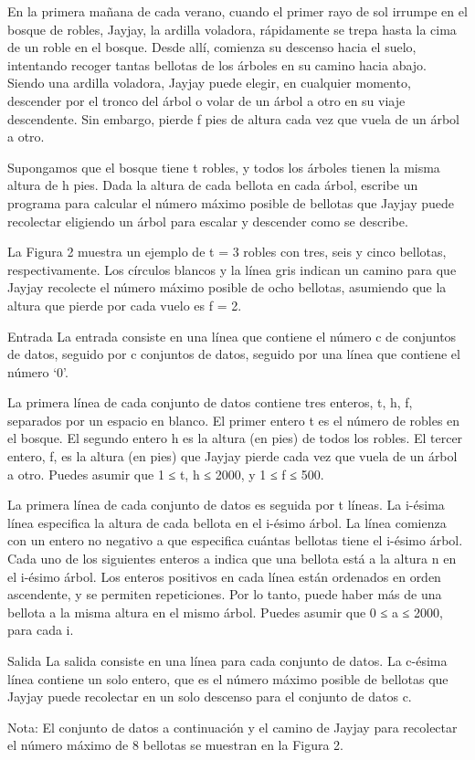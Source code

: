 En la primera mañana de cada verano, cuando el primer rayo de sol irrumpe en el bosque de robles, Jayjay, la ardilla voladora, rápidamente se trepa hasta la cima de un roble en el bosque. Desde allí, comienza su descenso hacia el suelo, intentando recoger tantas bellotas de los árboles en su camino hacia abajo. Siendo una ardilla voladora, Jayjay puede elegir, en cualquier momento, descender por el tronco del árbol o volar de un árbol a otro en su viaje descendente. Sin embargo, pierde f pies de altura cada vez que vuela de un árbol a otro. 

Supongamos que el bosque tiene t robles, y todos los árboles tienen la misma altura de h pies. Dada la altura de cada bellota en cada árbol, escribe un programa para calcular el número máximo posible de bellotas que Jayjay puede recolectar eligiendo un árbol para escalar y descender como se describe. 

La Figura 2 muestra un ejemplo de t = 3 robles con tres, seis y cinco bellotas, respectivamente. Los círculos blancos y la línea gris indican un camino para que Jayjay recolecte el número máximo posible de ocho bellotas, asumiendo que la altura que pierde por cada vuelo es f = 2. 

Entrada 
La entrada consiste en una línea que contiene el número c de conjuntos de datos, seguido por c conjuntos de datos, seguido por una línea que contiene el número ‘0’. 

La primera línea de cada conjunto de datos contiene tres enteros, t, h, f, separados por un espacio en blanco. El primer entero t es el número de robles en el bosque. El segundo entero h es la altura (en pies) de todos los robles. El tercer entero, f, es la altura (en pies) que Jayjay pierde cada vez que vuela de un árbol a otro. Puedes asumir que 1 ≤ t, h ≤ 2000, y 1 ≤ f ≤ 500. 

La primera línea de cada conjunto de datos es seguida por t líneas. La i-ésima línea especifica la altura de cada bellota en el i-ésimo árbol. La línea comienza con un entero no negativo a que especifica cuántas bellotas tiene el i-ésimo árbol. Cada uno de los siguientes enteros a indica que una bellota está a la altura n en el i-ésimo árbol. Los enteros positivos en cada línea están ordenados en orden ascendente, y se permiten repeticiones. Por lo tanto, puede haber más de una bellota a la misma altura en el mismo árbol. Puedes asumir que 0 ≤ a ≤ 2000, para cada i. 

Salida 
La salida consiste en una línea para cada conjunto de datos. La c-ésima línea contiene un solo entero, que es el número máximo posible de bellotas que Jayjay puede recolectar en un solo descenso para el conjunto de datos c. 

Nota: El conjunto de datos a continuación y el camino de Jayjay para recolectar el número máximo de 8 bellotas se muestran en la Figura 2.

